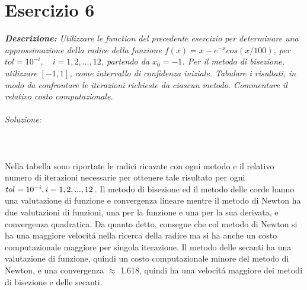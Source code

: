 \section{Esercizio 6}

\textit{\textbf{Descrizione:} Utilizzare le function del precedente esercizio per determinare una approssimazione della radice della funzione
$f(x) = x - e^{-x}cos(x/100)$,  per $tol = 10^{-i}, \quad i=1, 2,...,12$, partendo da $x_{0} = -1$. Per il metodo di bisezione,
utilizzare $[-1, 1]$, come intervallo di confidenza iniziale. Tabulare i risultati, in modo da confrontare le iterazioni richieste da ciascun metodo. Commentare il relativo costo computazionale.}\\~\\
\emph{Soluzione: }\\~\\

\\~\\
Nella tabella sono riportate le radici ricavate con ogni metodo e il relativo numero di iterazioni necessarie per ottenere tale risultato per ogni $tol = 10^{-i}, \quad \newline i=1, 2,...,12$.\newline
Il metodo di bisezione ed il metodo delle corde hanno una valutazione di funzione e convergenza lineare mentre il metodo di Newton ha due valutazioni di funzioni, una per la funzione e una per la sua derivata, e convergenza quadratica. Da quanto detto, consegue che col metodo di Newton si ha una maggiore velocit\'a nella ricerca della radice ma si ha anche un costo computazionale maggiore per singola iterazione. Il metodo delle secanti ha una valutazione di funzione, quindi un costo computazionale minore del metodo di Newton,  e una convergenza $\approx$ 1.618, quindi ha una velocit\'a maggiore dei metodi di bisezione e delle secanti.